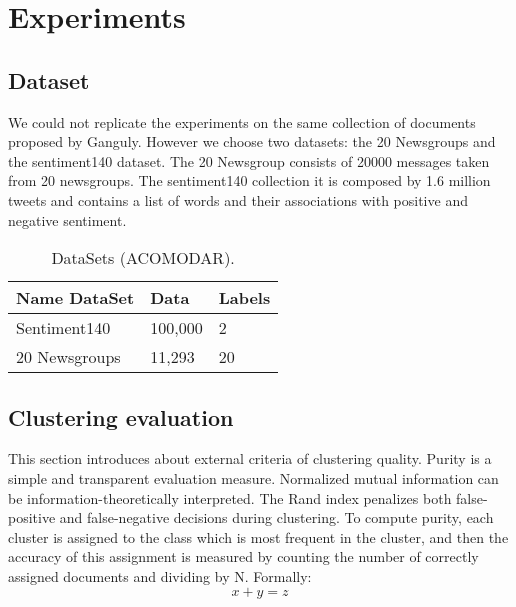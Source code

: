 \documentclass[runningheads]{llncs}
\begin{document}
\section{Experiments}

\subsection{Dataset}

We could not replicate the experiments on the same collection of
documents proposed by Ganguly\cite{ganguly_2018}. However 
we choose two datasets: the 20 Newsgroups and the sentiment140 dataset.
The 20 Newsgroup consists of 20000 messages taken from 20 newsgroups. 
The sentiment140 collection it is composed by 1.6 million tweets and contains a list of words and their associations with positive and negative sentiment.


\begin{table}
\centering
\caption{DataSets (ACOMODAR).}\label{tab1}
\begin{tabular}{|l|l|l|}
\hline
Name DataSet &  Data & Labels\\
\hline
Sentiment140 &  100,000& 2\\
20 Newsgroups & 11,293 & 20\\
\hline
\end{tabular}
\end{table}

%

\subsection{Clustering evaluation}

This section introduces about external criteria of clustering quality. Purity is
a simple and transparent evaluation measure. Normalized mutual information
can be information-theoretically interpreted. The Rand index penalizes both
false-positive and false-negative decisions during clustering.
To compute purity, each cluster is assigned to the class which is most frequent
in the cluster, and then the accuracy of this assignment is measured
by counting the number of correctly assigned documents and dividing by N.
Formally:
\begin{equation}
x + y = z
\end{equation}
\end{document}
